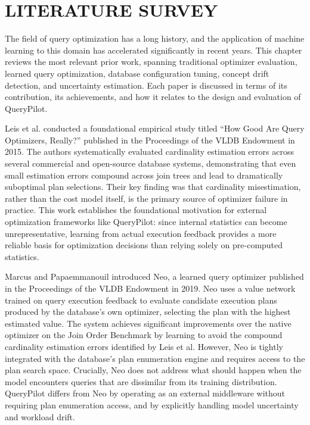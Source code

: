 
\chapter{LITERATURE SURVEY}
\label{chap:literature_survey}

The field of query optimization has a long history, and the application of
machine learning to this domain has accelerated significantly in recent years.
This chapter reviews the most relevant prior work, spanning traditional
optimizer evaluation, learned query optimization, database configuration
tuning, concept drift detection, and uncertainty estimation. Each paper is
discussed in terms of its contribution, its achievements, and how it relates
to the design and evaluation of QueryPilot.

Leis et al. \cite{leis2015good} conducted a foundational empirical study
titled ``How Good Are Query Optimizers, Really?'' published in the Proceedings
of the VLDB Endowment in 2015. The authors systematically evaluated
cardinality estimation errors across several commercial and open-source
database systems, demonstrating that even small estimation errors compound
across join trees and lead to dramatically suboptimal plan selections. Their
key finding was that cardinality misestimation, rather than the cost model
itself, is the primary source of optimizer failure in practice. This work
establishes the foundational motivation for external optimization frameworks
like QueryPilot: since internal statistics can become unrepresentative,
learning from actual execution feedback provides a more reliable basis for
optimization decisions than relying solely on pre-computed statistics.

Marcus and Papaemmanouil \cite{marcus2019neo} introduced Neo, a learned query
optimizer published in the Proceedings of the VLDB Endowment in 2019. Neo uses
a value network trained on query execution feedback to evaluate candidate
execution plans produced by the database's own optimizer, selecting the plan
with the highest estimated value. The system achieves significant improvements
over the native optimizer on the Join Order Benchmark by learning to avoid the
compound cardinality estimation errors identified by Leis et al. However, Neo
is tightly integrated with the database's plan enumeration engine and requires
access to the plan search space. Crucially, Neo does not address what should
happen when the model encounters queries that are dissimilar from its training
distribution. QueryPilot differs from Neo by operating as an external
middleware without requiring plan enumeration access, and by explicitly
handling model uncertainty and workload drift.


